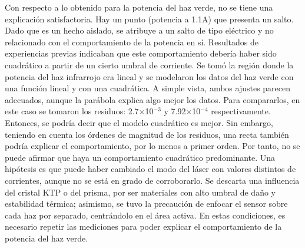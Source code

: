 \documentclass[10pt, a4paper]{article}%
\begin{document}
\begin{multicols}{2}
Con respecto a lo obtenido para la potencia del haz verde, no se tiene una explicación satisfactoria. Hay un punto (potencia a 1.1A) que presenta un salto. Dado que es un hecho aislado, se atribuye a un salto de tipo eléctrico y no relacionado con el comportamiento de la potencia en sí. Resultados de experiencias previas indicaban que este comportamiento debería haber sido cuadrático a partir de un cierto umbral de corriente. Se tomó la región donde la potencia del haz infrarrojo era lineal y se modelaron los datos del haz verde con una función lineal y con una cuadrática. A simple vista, ambos ajustes parecen adecuados, aunque la parábola explica algo mejor los datos. Para compararlos, en este caso se tomaron los residuos: 2.7$\times$10$^{-3}$ y  7.92$\times$10$^{-4}$ respectivamente. Entonces, se podría decir que el modelo cuadrático es mejor. Sin embargo, teniendo en cuenta los órdenes de magnitud de los residuos, una recta también podría explicar el comportamiento, por lo menos a primer orden. Por tanto, no se puede afirmar que haya un comportamiento cuadrático predominante. Una hipótesis es que puede haber cambiado el modo del láser con valores distintos de corrientes, aunque no se está en grado de corroborarlo. Se descarta una influencia del cristal KTP o del prisma, por ser materiales con alto umbral de daño y estabilidad térmica; asimismo, se tuvo la precaución de enfocar el sensor sobre cada haz por separado, centrándolo en el área activa. En estas condiciones, es necesario repetir las mediciones para poder explicar el comportamiento de la potencia del haz verde.


\end{multicols}
\end{document}

